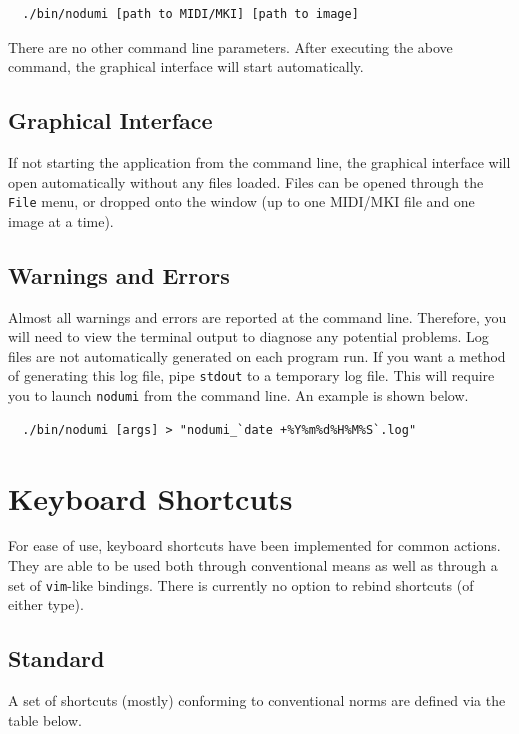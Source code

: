 \documentclass[english]{article}
\providecommand{\mi}[1]{\texttt{#1}}
\begin{document}
\begin{verbatim}
  ./bin/nodumi [path to MIDI/MKI] [path to image]
\end{verbatim}

There are no other command line parameters. After executing the above command, the graphical interface will start automatically. 

\subsection{Graphical Interface}

If not starting the application from the command line, the graphical interface will open automatically without any files loaded.
Files can be opened through the \mi{File} menu, or dropped onto the window (up to one MIDI/MKI file and one image at a time).

\subsection{Warnings and Errors}

Almost all warnings and errors are reported at the command line. Therefore, you will need to view the terminal output to
diagnose any potential problems. Log files are not automatically generated on each program run. If you want a method of
generating this log file, pipe \mi{stdout} to a temporary log file. This will require you to launch \mi{nodumi} from the command
line. An example is shown below.

\begin{verbatim}
  ./bin/nodumi [args] > "nodumi_`date +%Y%m%d%H%M%S`.log"
\end{verbatim}

\newpage
\section{Keyboard Shortcuts}

For ease of use, keyboard shortcuts have been implemented for common actions. They are able to be used both through conventional
means as well as through a set of \mi{vim}-like bindings. There is currently no option to rebind shortcuts (of either type).

\subsection{Standard}
\label{subsec:kbshortcut}

A set of shortcuts (mostly) conforming to conventional norms are defined via the table below.
\end{document}
